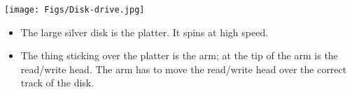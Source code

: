 \newpage
\begin{frame}[fragile]
\begin{center}
\texttt{[image: Figs/Disk-drive.jpg]}
\end{center}


\BNotes\ifnum{}
\begin{itemize}
	\item The large silver disk is the platter.  It spins at high speed.
	\item The thing sticking over the platter is the arm; at the tip
		of the arm is the read/write head.  The arm has to move the
		read/write head over the correct track of the disk.
\end{itemize}
\fi\ENotes
\end{frame}

